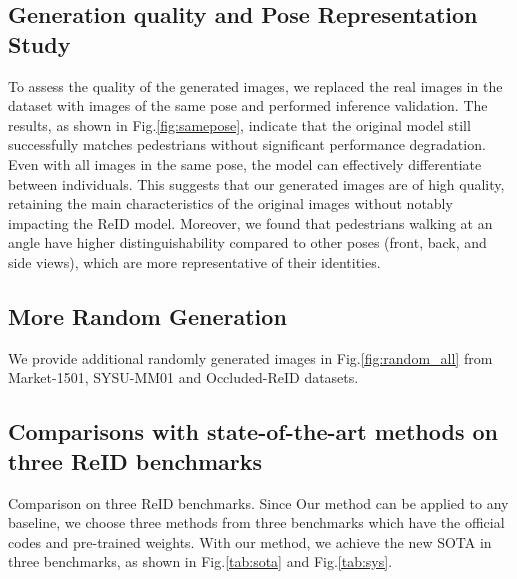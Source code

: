 \subsection{Generation quality and Pose Representation Study}
To assess the quality of the generated images, we replaced the real images in the dataset with images of the same pose and performed inference validation. The results, as shown in Fig.\ref{fig:samepose}, indicate that the original model still successfully matches pedestrians without significant performance degradation. Even with all images in the same pose, the model can effectively differentiate between individuals. This suggests that our generated images are of high quality, retaining the main characteristics of the original images without notably impacting the ReID model. Moreover, we found that pedestrians walking at an angle have higher distinguishability compared to other poses (front, back, and side views), which are more representative of their identities.



\subsection{More Random Generation}
We provide additional randomly generated images in Fig.\ref{fig:random_all} from Market-1501, SYSU-MM01 and Occluded-ReID datasets.

\subsection{Comparisons with state-of-the-art methods on three ReID benchmarks}
Comparison on three ReID benchmarks. Since Our method can be applied to any baseline, we choose three methods from three benchmarks which have the official codes and pre-trained weights. With our method, we achieve the new SOTA in three benchmarks, as shown in Fig.\ref{tab:sota} and Fig.\ref{tab:sys}.





